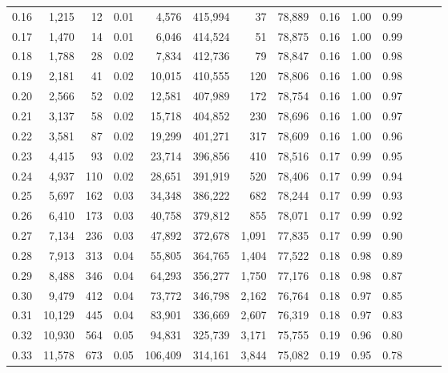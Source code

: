 \begin{tabular}{rrrrrrrrrrrrrr}
0.16 &   1,215 &     12 &  0.01 &    4,576 &  415,994 &      37 &  78,889 &  0.16 &  1.00 &      0.99 \\
0.17 &   1,470 &     14 &  0.01 &    6,046 &  414,524 &      51 &  78,875 &  0.16 &  1.00 &      0.99 \\
0.18 &   1,788 &     28 &  0.02 &    7,834 &  412,736 &      79 &  78,847 &  0.16 &  1.00 &      0.98 \\
0.19 &   2,181 &     41 &  0.02 &   10,015 &  410,555 &     120 &  78,806 &  0.16 &  1.00 &      0.98 \\
0.20 &   2,566 &     52 &  0.02 &   12,581 &  407,989 &     172 &  78,754 &  0.16 &  1.00 &      0.97 \\
0.21 &   3,137 &     58 &  0.02 &   15,718 &  404,852 &     230 &  78,696 &  0.16 &  1.00 &      0.97 \\
0.22 &   3,581 &     87 &  0.02 &   19,299 &  401,271 &     317 &  78,609 &  0.16 &  1.00 &      0.96 \\
0.23 &   4,415 &     93 &  0.02 &   23,714 &  396,856 &     410 &  78,516 &  0.17 &  0.99 &      0.95 \\
0.24 &   4,937 &    110 &  0.02 &   28,651 &  391,919 &     520 &  78,406 &  0.17 &  0.99 &      0.94 \\
0.25 &   5,697 &    162 &  0.03 &   34,348 &  386,222 &     682 &  78,244 &  0.17 &  0.99 &      0.93 \\
0.26 &   6,410 &    173 &  0.03 &   40,758 &  379,812 &     855 &  78,071 &  0.17 &  0.99 &      0.92 \\
0.27 &   7,134 &    236 &  0.03 &   47,892 &  372,678 &   1,091 &  77,835 &  0.17 &  0.99 &      0.90 \\
0.28 &   7,913 &    313 &  0.04 &   55,805 &  364,765 &   1,404 &  77,522 &  0.18 &  0.98 &      0.89 \\
0.29 &   8,488 &    346 &  0.04 &   64,293 &  356,277 &   1,750 &  77,176 &  0.18 &  0.98 &      0.87 \\
0.30 &   9,479 &    412 &  0.04 &   73,772 &  346,798 &   2,162 &  76,764 &  0.18 &  0.97 &      0.85 \\
0.31 &  10,129 &    445 &  0.04 &   83,901 &  336,669 &   2,607 &  76,319 &  0.18 &  0.97 &      0.83 \\
0.32 &  10,930 &    564 &  0.05 &   94,831 &  325,739 &   3,171 &  75,755 &  0.19 &  0.96 &      0.80 \\
0.33 &  11,578 &    673 &  0.05 &  106,409 &  314,161 &   3,844 &  75,082 &  0.19 &  0.95 &      0.78 \\

\end{tabular}

